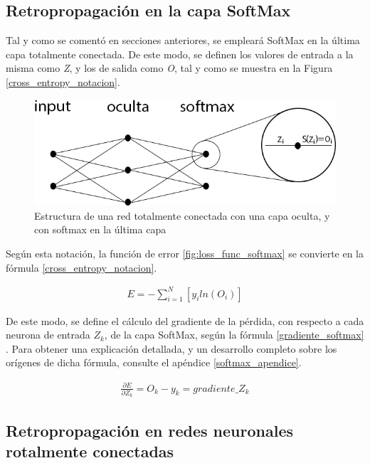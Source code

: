 \subsection{Retropropagación en la capa SoftMax} 

Tal y como se comentó en secciones anteriores, se empleará SoftMax en la última capa totalmente conectada. De este modo, se definen los valores de entrada a la misma como \textit{Z}, y los de salida como \textit{O}, tal y como se muestra en la Figura \ref{cross_entropy_notacion}.

\begin{figure}[H]
	\centering
	\includegraphics[scale=0.4]{imagenes/NN_softmax.jpg}  
	\caption{Estructura de una red totalmente conectada con una capa oculta, y con softmax en la última capa}
	\label{fig:nn_softmax_1_capa}
\end{figure}

Según esta notación, la función de error \ref{fig:loss_func_softmax} se convierte en la fórmula \ref{cross_entropy_notacion}.

\begin{gather}
	E = - \sum_{i=1}^{N}  [y_i ln(O_i)] 
	\label{cross_entropy_notacion}
\end{gather}

De este modo, se define el cálculo del gradiente de la pérdida, con respecto a cada neurona de entrada $Z_k$, de la capa SoftMax, según la fórmula \ref{gradiente_softmax} \cite{Cross_entropy_backprop} \cite{Cross_entropy_backprop_grad_input}. Para obtener una explicación detallada, y un desarrollo completo sobre los orígenes de dicha fórmula, consulte el apéndice \ref{softmax_apendice}.

\begin{gather}
	\frac{\partial E}{\partial Z_k} = O_k - y_k = gradiente\_Z_k
	\label{gradiente_softmax}
\end{gather}


\subsection{Retropropagación en redes neuronales rotalmente conectadas}

